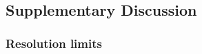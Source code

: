 \documentclass[11pt]{article}
\begin{document}
    \begin{Verbatim}[commandchars=\\\{\}]


    \end{Verbatim}

    \begin{center}
    \end{center}
    { \hspace*{\fill} \\}
    
    \subsection{Supplementary Discussion}\label{supplementary-discussion}

    \subsubsection{Resolution limits}\label{resolution-limits}


    
    
    
    
\end{document}
